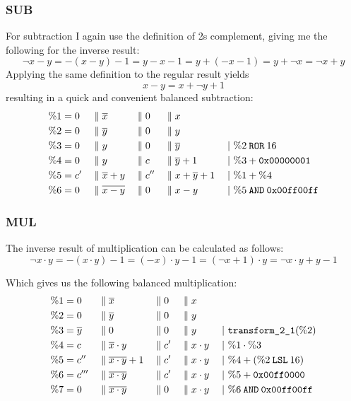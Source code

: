 \subsubsection{SUB}
For subtraction I again use the definition of 2s complement, giving me the following for the inverse result:
\begin{equation*}
  \neg{x-y} = - (x-y) - 1 = y - x - 1 = y + (-x -1) = y + \neg{x} = \neg{x} + y
\end{equation*}
Applying the same definition to the regular result yields
\begin{equation*}
  x-y = x + \neg{y} + 1
\end{equation*}
resulting in a quick and convenient balanced subtraction:
\begin{align*}
  \%1 &= 0 &&\; \| \; \overline{x} &&\; \| \; 0 &&\; \| \; x &&\\
  \%2 &= 0 &&\; \| \; \overline{y} &&\; \| \; 0 &&\; \| \; y &&\\
  \%3 &= 0 &&\; \| \; y &&\; \| \; 0 &&\; \| \; \overline{y} && \;|\ \%2 \mathbin{\texttt{ROR}} 16\\
  \%4 &= 0 &&\; \| \; y &&\; \| \; c &&\; \| \; \overline{y}+1 && \;|\ \%3 + \texttt{0x00000001}\\
  \%5 &= c' &&\; \| \; \overline{x}+y &&\; \| \; c'' &&\; \| \; x+\overline{y}+1 && \;|\ \%1 + \%4\\
  \%6 &= 0 &&\; \| \; \overline{x-y} &&\; \| \; 0 &&\; \| \; x-y && \;|\ \%5 \mathbin{\texttt{AND}} \texttt{0x00ff00ff}
\end{align*}

\subsubsection{MUL}
The inverse result of multiplication can be calculated as follows:
\begin{equation*}
  \neg{x \cdot y} = -(x \cdot y) - 1 = (-x) \cdot y - 1 = (\neg{x} + 1) \cdot y = \neg{x} \cdot y + y - 1
\end{equation*}

Which gives us the following balanced multiplication:
\begin{align*}
  \%1 &= 0 &&\; \| \; \overline{x} &&\; \| \; 0 &&\; \| \; x &&\\
  \%2 &= 0 &&\; \| \; \overline{y} &&\; \| \; 0 &&\; \| \; y &&\\
  \%3 &= \overline{y} &&\; \| \; 0 &&\; \| \; 0 &&\; \| \; y && \;|\ \texttt{transform\_2\_1}(\%2)\\
  \%4 &= c &&\; \| \; \overline{x}\cdot y &&\; \| \; c' &&\; \| \; x \cdot y && \;|\ \%1 \cdot \%3\\
  \%5 &= c'' &&\; \| \; \overline{x \cdot y} +1 &&\; \| \; c' &&\; \| \; x \cdot y && \;|\ \%4 + (\%2 \mathbin{\texttt{LSL}} 16)\\
  \%6 &= c''' &&\; \| \; \overline{x \cdot y} &&\; \| \; c' &&\; \| \; x \cdot y && \;|\ \%5 + \texttt{0x00ff0000}\\
  \%7 &= 0 &&\; \| \; \overline{x \cdot y} &&\; \| \; 0 &&\; \| \; x \cdot y && \;|\ \%6 \mathbin{\texttt{AND}} \texttt{0x00ff00ff}
\end{align*}

